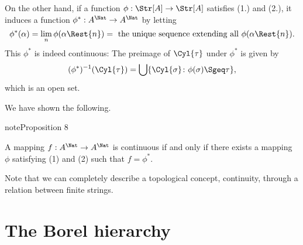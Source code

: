 \documentclass[letterpaper,10pt,english]{jupyterBook}
\begin{document}
\sphinxAtStartPar
On the other hand, if a function \(\phi: \Str[A] \to \Str[A]\) satisfies (1.) and (2.), it induces a function \(\phi^*: A^\Nat \to A^\Nat\) by letting
\begin{equation*}
	\phi^*(\alpha) = \lim_n \phi(\alpha\Rest{n}) = \text{ the unique sequence extending all $\phi(\alpha\Rest{n})$}.
\end{equation*}
\sphinxAtStartPar
This \(\phi^*\) is indeed continuous: The preimage of \(\Cyl{\tau}\) under \(\phi^*\) is given by
\begin{equation*}
	(\phi^*)^{-1}(\Cyl{\tau}) = \bigcup \{\Cyl{\sigma} \colon \phi(\sigma) \Sgeq \tau \},
\end{equation*}
\sphinxAtStartPar
which is an open set.

\sphinxAtStartPar
We have shown the following.
\label{trees:prop-product-continuous}
\begin{sphinxadmonition}{note}{Proposition 8}



\sphinxAtStartPar
A mapping \(f:A^\Nat \to A^\Nat\) is continuous if and only if there exists a mapping \(\phi\) satisfying (1) and (2) such that \(f = \phi^*\).
\end{sphinxadmonition}

\sphinxAtStartPar
Note that we can completely describe a topological concept, continuity, through a relation between finite strings.

\sphinxstepscope


\part{The Borel hierarchy}

\sphinxstepscope
\end{document}

